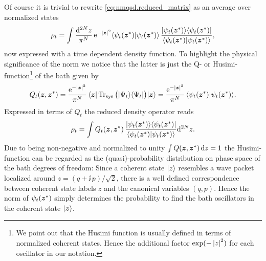 Of course it is trivial to rewrite \autoref{eq:nmqsd.reduced_matrix} as an average over normalized states
\begin{equation*}
  \rho_t = \int \frac{\mathrm{d}^{2N} z}{\pi^N} \, \exp[-\abs{\zz}^2] \braket{\psitz}{\psitz} \, \frac{\ket{\psitz}\bra{\psitz}}{\braket{\psitz}{\psitz}},
\end{equation*}
now expressed with a time dependent density function.
To highlight the physical significance of the norm we notice that the latter is just the Q- or Husimi-function\footnote{We point out that the Husimi function is usually defined in terms of normalized coherent states. Hence the additional factor $\exp(-\abs{z}^2)$ for each oscillator in our notation.} of the bath given by \cite{Sc11_quantum_optics}
\begin{equation}
  Q_t(\zz, \cc\zz) = \frac{\exp[-\abs{\zz}^2]}{\pi^N}\, \bra{\zz} \Tr{sys} \big( \ket{\Psi_t}\bra{\Psi_t} \big)\ket{\zz}
                   = \frac{\exp[-\abs{\zz}^2]}{\pi^N}\, \braket{\psitz}{\psitz}.
  \label{eq:nmqsd.husimi}
\end{equation}
Expressed in terms of $Q_t$ the reduced density operator reads
\begin{equation}
  \rho_t = \int Q_t(\boldsymbol{z}, {\boldsymbol{z}}^*) \, \frac{| \psi_t({\boldsymbol{z}}^*) \rangle\langle \psi_t({\boldsymbol{z}}^*) |}{\langle \psi_t({\boldsymbol{z}}^*) | \psi_t({\boldsymbol{z}}^*) \rangle} \mathrm{d}^{2N} z.
  \label{eq:nmqsd.rho_in_Q}
\end{equation}
Due to being non-negative and normalized to unity $\int Q(\boldsymbol{z}, {\boldsymbol{z}}^*) \, \mathrm{d} z = 1$ the Husimi-function can be regarded as the (quasi)-probability distribution on phase space of the bath degrees of freedom:
Since a coherent state $| z \rangle$ resembles a wave packet localized around $z = (q + \ii \, p) / \sqrt{2}$, there is a well defined correspondence between coherent state labels $z$ and the canonical variables $(q, p)$.
Hence the norm of $\psi_t({\boldsymbol{z}}^*)$ simply determines the probability to find the bath oscillators in the coherent state $| \boldsymbol{z} \rangle$.\\

